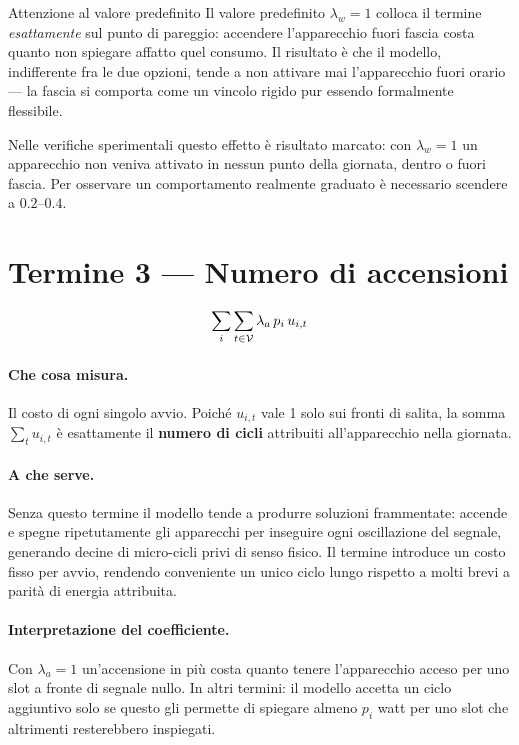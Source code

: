 \begin{warnbox}{Attenzione al valore predefinito}
Il valore predefinito $\lambda_w = 1$ colloca il termine \emph{esattamente} sul punto di pareggio:
accendere l'apparecchio fuori fascia costa quanto non spiegare affatto quel consumo. Il risultato
è che il modello, indifferente fra le due opzioni, tende a non attivare mai l'apparecchio fuori
orario --- la fascia si comporta come un vincolo rigido pur essendo formalmente flessibile.

Nelle verifiche sperimentali questo effetto è risultato marcato: con $\lambda_w = 1$ un
apparecchio non veniva attivato in nessun punto della giornata, dentro o fuori fascia. Per
osservare un comportamento realmente graduato è necessario scendere a $0.2$--$0.4$.
\end{warnbox}

\section{Termine 3 --- Numero di accensioni}

\begin{equation}
  \sum_{i} \sum_{t \in \mathcal{V}} \lambda_a \, p_i \, u_{i,t}
\end{equation}

\paragraph{Che cosa misura.} Il costo di ogni singolo avvio. Poiché $u_{i,t}$ vale 1 solo sui
fronti di salita, la somma $\sum_t u_{i,t}$ è esattamente il \textbf{numero di cicli} attribuiti
all'apparecchio nella giornata.

\paragraph{A che serve.} Senza questo termine il modello tende a produrre soluzioni frammentate:
accende e spegne ripetutamente gli apparecchi per inseguire ogni oscillazione del segnale,
generando decine di micro-cicli privi di senso fisico. Il termine introduce un costo fisso per
avvio, rendendo conveniente un unico ciclo lungo rispetto a molti brevi a parità di energia
attribuita.

\paragraph{Interpretazione del coefficiente.} Con $\lambda_a = 1$ un'accensione in più costa quanto
tenere l'apparecchio acceso per uno slot a fronte di segnale nullo. In altri termini: il modello
accetta un ciclo aggiuntivo solo se questo gli permette di spiegare almeno $p_i$ watt per uno slot
che altrimenti resterebbero inspiegati.

